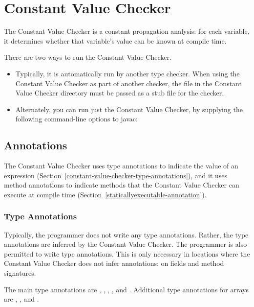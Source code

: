 \htmlhr
\chapter{Constant Value Checker\label{constant-value-checker}}

The Constant Value Checker is a constant propagation analysis: for
each variable, it determines whether that variable's value can be
known at compile time.

There are two ways to run the Constant Value Checker.
\begin{itemize}
\item
Typically, it is automatically run by another type checker.
When using the Constant Value Checker as part of another checker, the
 file in the Constant Value Checker directory must
be passed as a stub file for the checker.
\item
Alternately, you can run just the Constant Value Checker, by
supplying the following command-line options to javac:
\end{itemize}

\section{Annotations\label{constant-value-checker-annotations}}

The Constant Value Checker uses type annotations to indicate the value of
an expression (Section~\ref{constant-value-checker-type-annotations}), and
it uses method annotations to indicate methods that the Constant Value
Checker can execute at compile time
(Section~\ref{staticallyexecutable-annotation}).


\subsection{Type Annotations\label{constant-value-checker-type-annotations}}

Typically, the programmer does not write any type annotations.  Rather, the
type annotations are inferred by the Constant Value Checker.
The programmer is also permitted to write type annotations.  This is only necessary in
locations where the Constant Value Checker does not infer annotations:  on fields
and method signatures.

The main type annotations are
,
,
,
, and
.
Additional type annotations for arrays are
,
,
and .

